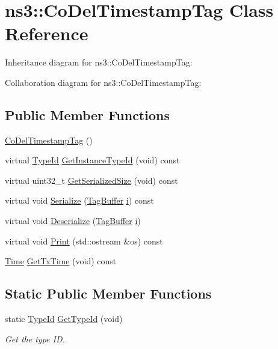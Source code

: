 \hypertarget{classns3_1_1CoDelTimestampTag}{}\section{ns3\+:\+:Co\+Del\+Timestamp\+Tag Class Reference}
\label{classns3_1_1CoDelTimestampTag}


Inheritance diagram for ns3\+:\+:Co\+Del\+Timestamp\+Tag\+:


Collaboration diagram for ns3\+:\+:Co\+Del\+Timestamp\+Tag\+:
\subsection*{Public Member Functions}
\begin{DoxyCompactItemize}
\item 
\hyperlink{classns3_1_1CoDelTimestampTag_a19df084587cdd088074688b45c600eec}{Co\+Del\+Timestamp\+Tag} ()
\item 
virtual \hyperlink{classns3_1_1TypeId}{Type\+Id} \hyperlink{classns3_1_1CoDelTimestampTag_ace515c4a401c55600d8cbe597a0368cb}{Get\+Instance\+Type\+Id} (void) const 
\item 
virtual uint32\+\_\+t \hyperlink{classns3_1_1CoDelTimestampTag_a3b38cba806a65c9ed2276878ce0d6dbe}{Get\+Serialized\+Size} (void) const 
\item 
virtual void \hyperlink{classns3_1_1CoDelTimestampTag_a546215b33ba3541a308d0398e8235d5e}{Serialize} (\hyperlink{classns3_1_1TagBuffer}{Tag\+Buffer} \hyperlink{lte__uplink__power__control_8m_a6f6ccfcf58b31cb6412107d9d5281426}{i}) const 
\item 
virtual void \hyperlink{classns3_1_1CoDelTimestampTag_a21a538953e30fe29989c190c69d725c5}{Deserialize} (\hyperlink{classns3_1_1TagBuffer}{Tag\+Buffer} \hyperlink{lte__uplink__power__control_8m_a6f6ccfcf58b31cb6412107d9d5281426}{i})
\item 
virtual void \hyperlink{classns3_1_1CoDelTimestampTag_ac03503fcb1e49efb5493fede40cd088c}{Print} (std\+::ostream \&os) const 
\item 
\hyperlink{classns3_1_1Time}{Time} \hyperlink{classns3_1_1CoDelTimestampTag_ab942abb470774a7a116fae50e51d2cb4}{Get\+Tx\+Time} (void) const 
\end{DoxyCompactItemize}
\subsection*{Static Public Member Functions}
\begin{DoxyCompactItemize}
\item 
static \hyperlink{classns3_1_1TypeId}{Type\+Id} \hyperlink{classns3_1_1CoDelTimestampTag_ac53f517bf05635169fe03cbc126a45ae}{Get\+Type\+Id} (void)
\begin{DoxyCompactList}\small\item\em Get the type ID. \end{DoxyCompactList}\end{DoxyCompactItemize}
